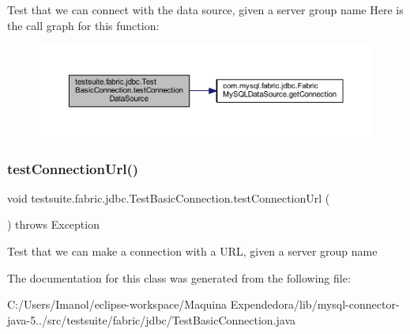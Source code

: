 Test that we can connect with the data source, given a server group name Here is the call graph for this function\+:
\nopagebreak
\begin{figure}[H]
\begin{center}
\leavevmode
\includegraphics[width=350pt]{classtestsuite_1_1fabric_1_1jdbc_1_1_test_basic_connection_a86081e38cdb6f9233486dcb721716dd2_cgraph}
\end{center}
\end{figure}
\mbox{\label{classtestsuite_1_1fabric_1_1jdbc_1_1_test_basic_connection_a755a5edbb2f2b38995e5b0ec295a6835}} 
\subsubsection{\texorpdfstring{test\+Connection\+Url()}{testConnectionUrl()}}
{\footnotesize\ttfamily void testsuite.\+fabric.\+jdbc.\+Test\+Basic\+Connection.\+test\+Connection\+Url (\begin{DoxyParamCaption}{ }\end{DoxyParamCaption}) throws Exception}

Test that we can make a connection with a U\+RL, given a server group name 

The documentation for this class was generated from the following file\+:\begin{DoxyCompactItemize}
\item 
C\+:/\+Users/\+Imanol/eclipse-\/workspace/\+Maquina Expendedora/lib/mysql-\/connector-\/java-\/5../src/testsuite/fabric/jdbc/Test\+Basic\+Connection.\+java\end{DoxyCompactItemize}
